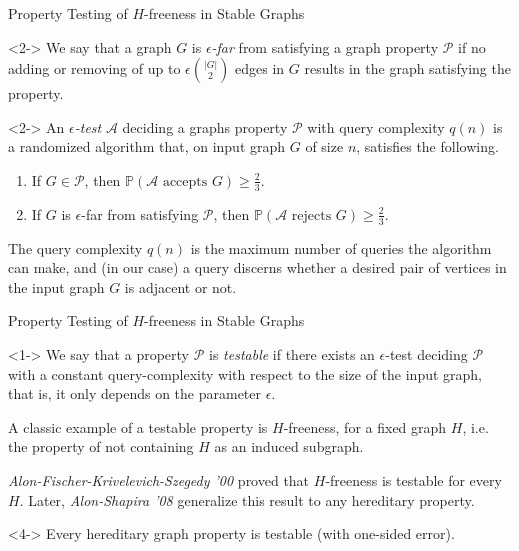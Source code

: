 \documentclass{beamer}
\newcommand{\parround}[1]{( #1 )}
\begin{document}
\begin{frame}{Property Testing of $H$-freeness in Stable Graphs}
    \begin{definition}<2->
        We say that a graph $G$ is \emph{$\epsilon$-far} from satisfying a graph property $\mathcal{P}$ if no adding or
        removing of up to $\epsilon {|G| \choose 2}$ edges in $G$ results in the graph satisfying the property.
    \end{definition}

    \begin{definition}<2->
        An \emph{$\epsilon$-test} $\mathcal{A}$ deciding a graphs property $\mathcal{P}$ with query complexity
        $q(n)$ is a randomized algorithm that, on input graph $G$ of size $n$,
        satisfies the following.
        \begin{enumerate}
            \item If $G \in \mathcal{P}$, then $\mathbb{P}\parround{\mathcal{A} \text{ accepts } G} \geq \frac{2}{3}$.
            \item If $G$ is $\epsilon$-far from satisfying $\mathcal{P}$,
                then $\mathbb{P}\parround{\mathcal{A} \text{ rejects } G} \geq \frac{2}{3}$.
        \end{enumerate}
        The query complexity $q(n)$ is the maximum number of queries the algorithm can make, and (in our case)
        a query discerns whether a desired pair of vertices in the input graph $G$ is adjacent or not.
    \end{definition}
\end{frame}

\begin{frame}{Property Testing of $H$-freeness in Stable Graphs}
    \begin{definition}<1->
        We say that a property $\mathcal{P}$ is \emph{testable} if there exists an $\epsilon$-test deciding $\mathcal{P}$
        with a constant query-complexity with respect to the size of the input graph, that is, it only depends on the
        parameter $\epsilon$.
    \end{definition}

     {
        A classic example of a testable property is $H$-freeness, for a fixed graph $H$, i.e. the property of not
        containing $H$ as an induced subgraph.
    }

     {
        \textit{Alon-Fischer-Krivelevich-Szegedy '00} proved that $H$-freeness is testable for every $H$.
    } {Later, \textit{Alon-Shapira '08}
        generalize this result to any hereditary property.%
    }

    \begin{theorem}<4->
        Every hereditary graph property is testable (with one-sided error).
    \end{theorem}
\end{frame}
\end{document}
